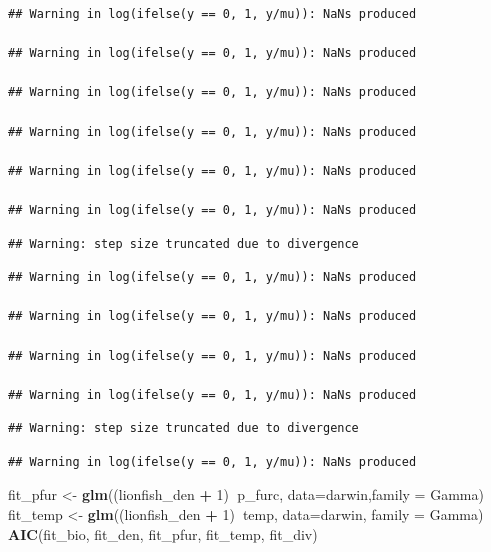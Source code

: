 \documentclass[]{article}
\newenvironment{Shaded}{\begin{snugshade}}{\end{snugshade}}
\newcommand{\KeywordTok}[1]{\textcolor[rgb]{0.13,0.29,0.53}{\textbf{#1}}}
\newcommand{\DataTypeTok}[1]{\textcolor[rgb]{0.13,0.29,0.53}{#1}}
\newcommand{\DecValTok}[1]{\textcolor[rgb]{0.00,0.00,0.81}{#1}}
\newcommand{\StringTok}[1]{\textcolor[rgb]{0.31,0.60,0.02}{#1}}
\newcommand{\OperatorTok}[1]{\textcolor[rgb]{0.81,0.36,0.00}{\textbf{#1}}}
\newcommand{\NormalTok}[1]{#1}
\begin{document}
\begin{verbatim}
## Warning in log(ifelse(y == 0, 1, y/mu)): NaNs produced

## Warning in log(ifelse(y == 0, 1, y/mu)): NaNs produced

## Warning in log(ifelse(y == 0, 1, y/mu)): NaNs produced

## Warning in log(ifelse(y == 0, 1, y/mu)): NaNs produced

## Warning in log(ifelse(y == 0, 1, y/mu)): NaNs produced

## Warning in log(ifelse(y == 0, 1, y/mu)): NaNs produced
\end{verbatim}

\begin{verbatim}
## Warning: step size truncated due to divergence
\end{verbatim}

\begin{verbatim}
## Warning in log(ifelse(y == 0, 1, y/mu)): NaNs produced

## Warning in log(ifelse(y == 0, 1, y/mu)): NaNs produced

## Warning in log(ifelse(y == 0, 1, y/mu)): NaNs produced

## Warning in log(ifelse(y == 0, 1, y/mu)): NaNs produced
\end{verbatim}

\begin{verbatim}
## Warning: step size truncated due to divergence
\end{verbatim}

\begin{verbatim}
## Warning in log(ifelse(y == 0, 1, y/mu)): NaNs produced
\end{verbatim}

\begin{Shaded}
\begin{Highlighting}[]
\NormalTok{fit_pfur <-}\StringTok{ }\KeywordTok{glm}\NormalTok{((lionfish_den }\OperatorTok{+}\StringTok{ }\DecValTok{1}\NormalTok{)}\OperatorTok{~}\NormalTok{p_furc, }\DataTypeTok{data=}\NormalTok{darwin,}\DataTypeTok{family =}\NormalTok{ Gamma)}
\NormalTok{fit_temp <-}\StringTok{ }\KeywordTok{glm}\NormalTok{((lionfish_den }\OperatorTok{+}\StringTok{ }\DecValTok{1}\NormalTok{)}\OperatorTok{~}\NormalTok{temp, }\DataTypeTok{data=}\NormalTok{darwin, }\DataTypeTok{family =}\NormalTok{ Gamma)}
\KeywordTok{AIC}\NormalTok{(fit_bio, fit_den, fit_pfur, fit_temp, fit_div)}
\end{Highlighting}
\end{Shaded}
\end{document}
